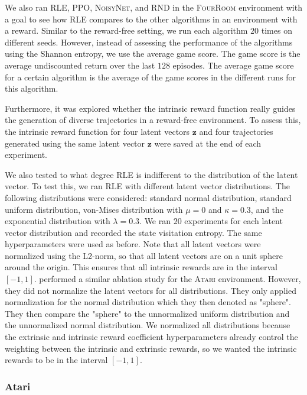 \documentclass[10pt]{article} %
\begin{document}
We also ran \textsc{RLE}, \textsc{PPO}, \textsc{NoisyNet}, and \textsc{RND} in the \textsc{FourRoom} environment with a goal to see how \textsc{RLE} compares to the other algorithms in an environment with a reward. Similar to the reward-free setting, we run each algorithm $20$ times on different seeds. However, instead of assessing the performance of the algorithms using the Shannon entropy, we use the average game score. The game score is the average undiscounted return over the last $128$ episodes. The average game score for a certain algorithm is the average of the game scores in the different runs for this algorithm.

Furthermore, it was explored whether the intrinsic reward function really guides the generation of diverse trajectories in a reward-free environment. To assess this, the intrinsic reward function for four latent vectors $\textbf{z}$ and four trajectories generated using the same latent vector $\textbf{z}$ were saved at the end of each experiment. 

We also tested to what degree \textsc{RLE} is indifferent to the distribution of the latent vector. To test this, we ran \textsc{RLE} with different latent vector distributions. The following distributions were considered: standard normal distribution, standard uniform distribution, von-Mises distribution with $\mu=0$ and $\kappa=0.3$, and the exponential distribution with $\lambda=0.3$. We ran $20$ experiments for each latent vector distribution and recorded the state visitation entropy. The same hyperparameters were used as before. Note that all latent vectors were normalized using the L2-norm, so that all latent vectors are on a unit sphere around the origin. This ensures that all intrinsic rewards are in the interval $[-1,1]$. \cite{rle-paper} performed a similar ablation study for the \textsc{Atari} environment. However, they did not normalize the latent vectors for all distributions. They only applied normalization for the normal distribution which they then denoted as "sphere". They then compare the "sphere" to the unnormalized uniform distribution and the unnormalized normal distribution. We normalized all distributions because the extrinsic and intrinsic reward coefficient hyperparameters already control the weighting between the intrinsic and extrinsic rewards, so we wanted the intrinsic rewards to be in the interval $[-1,1]$.

\subsubsection{Atari}
\end{document}
